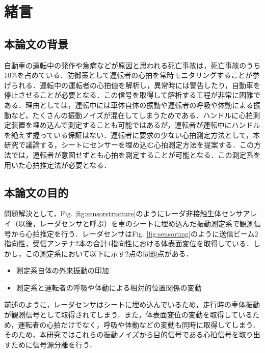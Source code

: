 \chapter{緒言}
\label{chap:intro}

\section{本論文の背景}
自動車の運転中の発作や急病などが原因と思われる死亡事故は，死亡事故のうち10\%を占めている．防御策として運転者の心拍を常時モニタリングすることが挙げられる．運転中の運転者の心拍値を解析し，異常時には警告したり，自動車を停止させることが必要となる．この信号を取得して解析する工程が非常に困難である．理由としては，運転中には車体自体の振動や運転者の呼吸や体動による振動など，たくさんの振動ノイズが混在してしまうためである．ハンドルに心拍測定装置を埋め込んで測定することも可能ではあるが，運転者が運転中にハンドルを絶えず握っている保証はない．運転者に要求の少ない心拍測定方法として，本研究で議論する，シートにセンサーを埋め込む心拍測定方法を提案する．この方法では，運転者が意図せずとも心拍を測定することが可能となる．この測定系を用いた心拍推定法が必要となる．

\section{本論文の目的}
問題解決として，Fig. \ref{fig:sensorstructure}のようにレーダ非接触生体センサアレイ（以後，レーダセンサと呼ぶ）を車のシートに埋め込んだ振動測定系で観測信号から心拍推定を行う．レーダセンサはFig. \ref{fig:sensorimg}のように送信ビーム2指向性，受信アンテナ2本の合計4指向性における体表面変位を取得している．しかし，この測定系において以下に示す2点の問題点がある．

\begin{itemize}
 \item 測定系自体の外来振動の印加
 \item 測定系と運転者の呼吸や体動による相対的位置関係の変動
\end{itemize}

前述のように，レーダセンサはシートに埋め込んでいるため，走行時の車体振動が観測信号として取得されてしまう．また，体表面変位の変動を取得しているため，運転者の心拍だけでなく，呼吸や体動などの変動も同時に取得してしまう．そのため，本研究ではこれらの振動ノイズから目的信号である心拍信号を取り出すために信号源分離を行う．


